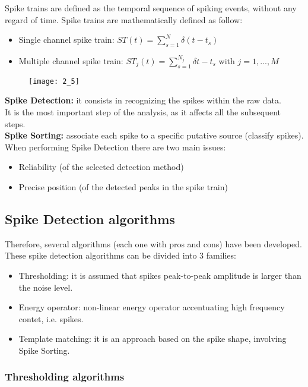 Spike trains are defined as the temporal sequence of spiking events, without
any regard of time. Spike trains are mathematically defined as follow:
\begin{itemize}
    \item Single channel spike train: \(ST(t)=\sum_{s=1}^{N}\delta{(t-t_s)}\)
    \item Multiple channel spike train: \(ST_j(t)=\sum_{s=1}^{N_j}\delta{t-t_s}\)
          with \(j=1,...,M\)
\end{itemize}
\begin{figure}[H]
    \texttt{[image: 2\_5]}
    \centering
\end{figure}
\textbf{Spike Detection:} it consists in recognizing the spikes within the raw data.\\
It is the most important step of the analysis, as it affects all
the subsequent steps.\\
\textbf{Spike Sorting:} associate each spike to a specific putative source
(classify spikes).\\
When performing Spike Detection there are two main issues:
\begin{itemize}
    \item Reliability (of the selected detection method)
    \item Precise position (of the detected peaks in the spike train)
\end{itemize}


\subsection{Spike Detection algorithms}
Therefore, several algorithms (each one with pros and cons) have been developed.
These spike detection algorithms can be divided into 3 families:
\begin{itemize}
    \item Thresholding: it is assumed that spikes peak-to-peak amplitude is larger
          than the noise level.
    \item Energy operator: non-linear energy operator accentuating high frequency
          contet, i.e. spikes.
    \item Template matching: it is an approach based on the spike shape,
          involving Spike Sorting.
\end{itemize}
\subsubsection{Thresholding algorithms}

